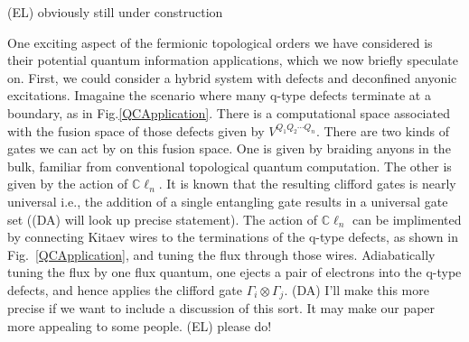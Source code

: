 \documentclass[12pt,a4paper]{article}
\newcommand{\tp}{\otimes}
\newcommand{\cl}{\mathbb{C}\ell}
\newcommand{\dave}[1]{{\color{ao(english)}\footnotesize{(DA) #1}}}
\newcommand{\ethan}[1]{{\color{amethyst}\footnotesize{(EL) #1}}}
\begin{document}
\ethan{obviously still under construction}


One exciting aspect of the fermionic topological orders we have considered is their potential quantum information 
applications, which we now briefly speculate on. 
First, we could consider a hybrid system with defects and deconfined anyonic excitations.
Imagaine the scenario where many q-type defects terminate at a boundary, as in Fig.\ref{QCApplication}. 
There is a computational space associated with the fusion space of those defects given by $V^{Q_1 Q_2 \cdots Q_n}$. 
There are two kinds of gates we can act by on this fusion space.
One is given by braiding anyons in the bulk, familiar from conventional topological quantum computation.
The other is given by the action of $\cl_n$.
It is known that the resulting clifford gates is nearly universal i.e., the addition of a single entangling gate results in a universal gate set (\dave{will look up precise statement}).
The action of $\cl_n$ can be implimented by connecting Kitaev wires to the terminations of the q-type defects, as shown in Fig.~\ref{QCApplication}, and tuning the flux through those wires. 
Adiabatically tuning the flux by one flux quantum, one ejects a pair of electrons into the q-type defects, and hence applies the clifford gate $\Gamma_i \tp \Gamma_j$.
\dave{I'll make this more precise if we want to include a discussion of this sort.
It may make our paper more appealing to some people.}
\ethan{please do!}
\end{document}
